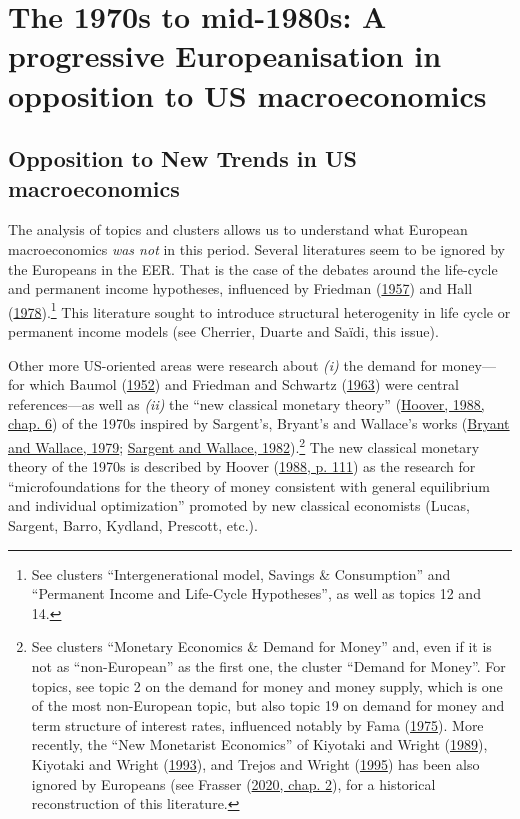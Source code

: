 \documentclass[
  12pt,
  onecolumn]{article}
\begin{document}
\hypertarget{the-1970s-to-mid-1980s-a-progressive-europeanisation-in-opposition-to-us-macroeconomics}{%
\section{The 1970s to mid-1980s: A progressive Europeanisation in
opposition to US
macroeconomics}\label{the-1970s-to-mid-1980s-a-progressive-europeanisation-in-opposition-to-us-macroeconomics}}

\hypertarget{opposition-to-new-trends-in-us-macroeconomics}{%
\subsection{Opposition to New Trends in US
macroeconomics}\label{opposition-to-new-trends-in-us-macroeconomics}}

The analysis of topics and clusters allows us to understand what
European macroeconomics \emph{was not} in this period. Several
literatures seem to be ignored by the Europeans in the EER. That is the
case of the debates around the life-cycle and permanent income
hypotheses, influenced by Friedman
(\protect\hyperlink{ref-friedman1957}{1957}) and Hall
(\protect\hyperlink{ref-hall1978b}{1978}).\footnote{See clusters
  ``Intergenerational model, Savings \& Consumption'' and ``Permanent
  Income and Life-Cycle Hypotheses'', as well as topics 12 and 14.} This
literature sought to introduce structural heterogenity in life cycle or
permanent income models (see Cherrier, Duarte and Saïdi, this issue).

Other more US-oriented areas were research about \emph{(i)} the demand
for money---for which Baumol (\protect\hyperlink{ref-baumol1952}{1952})
and Friedman and Schwartz (\protect\hyperlink{ref-friedman1963}{1963})
were central references---as well as \emph{(ii)} the ``new classical
monetary theory'' (\protect\hyperlink{ref-hoover1988}{Hoover, 1988,
chap. 6}) of the 1970s inspired by Sargent's, Bryant's and Wallace's
works (\protect\hyperlink{ref-bryant1979}{Bryant and Wallace, 1979};
\protect\hyperlink{ref-sargent1982}{Sargent and Wallace,
1982}).\footnote{See clusters ``Monetary Economics \& Demand for Money''
  and, even if it is not as ``non-European'' as the first one, the
  cluster ``Demand for Money''. For topics, see topic 2 on the demand
  for money and money supply, which is one of the most non-European
  topic, but also topic 19 on demand for money and term structure of
  interest rates, influenced notably by Fama
  (\protect\hyperlink{ref-fama1975}{1975}). More recently, the ``New
  Monetarist Economics'' of Kiyotaki and Wright
  (\protect\hyperlink{ref-kiyotaki1989}{1989}), Kiyotaki and Wright
  (\protect\hyperlink{ref-kiyotaki1993}{1993}), and Trejos and Wright
  (\protect\hyperlink{ref-trejos1995}{1995}) has been also ignored by
  Europeans (see Frasser (\protect\hyperlink{ref-frasser2020}{2020,
  chap. 2}), for a historical reconstruction of this literature.} The
new classical monetary theory of the 1970s is described by Hoover
(\protect\hyperlink{ref-hoover1988}{1988, p. 111}) as the research for
``microfoundations for the theory of money consistent with general
equilibrium and individual optimization'' promoted by new classical
economists (Lucas, Sargent, Barro, Kydland, Prescott, etc.).
\end{document}
